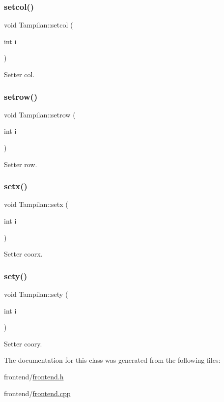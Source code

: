 \mbox{\label{classTampilan_ac617ef582e2fe3a894c71372f60e562f}} 
\subsubsection{\texorpdfstring{setcol()}{setcol()}}
{\footnotesize\ttfamily void Tampilan\+::setcol (\begin{DoxyParamCaption}\item[{int}]{i }\end{DoxyParamCaption})}



Setter col. 

\mbox{\label{classTampilan_aaec0545eaf5a7646482158078d0e6cd3}} 
\subsubsection{\texorpdfstring{setrow()}{setrow()}}
{\footnotesize\ttfamily void Tampilan\+::setrow (\begin{DoxyParamCaption}\item[{int}]{i }\end{DoxyParamCaption})}



Setter row. 

\mbox{\label{classTampilan_a1c8443c5bde9718f078ea517bf9f27f0}} 
\subsubsection{\texorpdfstring{setx()}{setx()}}
{\footnotesize\ttfamily void Tampilan\+::setx (\begin{DoxyParamCaption}\item[{int}]{i }\end{DoxyParamCaption})}



Setter coorx. 

\mbox{\label{classTampilan_a697d4d73cd649452b0c1aa8ef17c38f9}} 
\subsubsection{\texorpdfstring{sety()}{sety()}}
{\footnotesize\ttfamily void Tampilan\+::sety (\begin{DoxyParamCaption}\item[{int}]{i }\end{DoxyParamCaption})}



Setter coory. 



The documentation for this class was generated from the following files\+:\begin{DoxyCompactItemize}
\item 
frontend/\mbox{\hyperlink{frontend_8h}{frontend.\+h}}\item 
frontend/\mbox{\hyperlink{frontend_8cpp}{frontend.\+cpp}}\end{DoxyCompactItemize}
